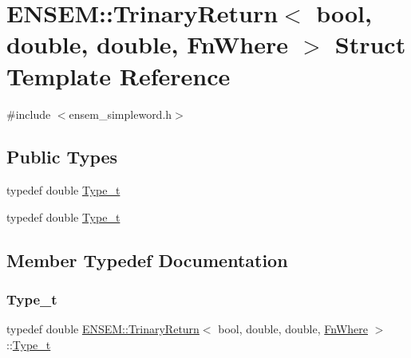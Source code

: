 \hypertarget{structENSEM_1_1TrinaryReturn_3_01bool_00_01double_00_01double_00_01FnWhere_01_4}{}\section{E\+N\+S\+EM\+:\+:Trinary\+Return$<$ bool, double, double, Fn\+Where $>$ Struct Template Reference}
\label{structENSEM_1_1TrinaryReturn_3_01bool_00_01double_00_01double_00_01FnWhere_01_4}


{\ttfamily \#include $<$ensem\+\_\+simpleword.\+h$>$}

\subsection*{Public Types}
\begin{DoxyCompactItemize}
\item 
typedef double \mbox{\hyperlink{structENSEM_1_1TrinaryReturn_3_01bool_00_01double_00_01double_00_01FnWhere_01_4_a9a6eb2e23b53eb2cd6021511101cd3a1}{Type\+\_\+t}}
\item 
typedef double \mbox{\hyperlink{structENSEM_1_1TrinaryReturn_3_01bool_00_01double_00_01double_00_01FnWhere_01_4_a9a6eb2e23b53eb2cd6021511101cd3a1}{Type\+\_\+t}}
\end{DoxyCompactItemize}


\subsection{Member Typedef Documentation}
\mbox{\label{structENSEM_1_1TrinaryReturn_3_01bool_00_01double_00_01double_00_01FnWhere_01_4_a9a6eb2e23b53eb2cd6021511101cd3a1}} 
\subsubsection{\texorpdfstring{Type\_t}{Type\_t}\hspace{0.1cm}{\footnotesize\ttfamily [1/2]}}
{\footnotesize\ttfamily typedef double \mbox{\hyperlink{structENSEM_1_1TrinaryReturn}{E\+N\+S\+E\+M\+::\+Trinary\+Return}}$<$ bool, double, double, \mbox{\hyperlink{structENSEM_1_1FnWhere}{Fn\+Where}} $>$\+::\mbox{\hyperlink{structENSEM_1_1TrinaryReturn_3_01bool_00_01double_00_01double_00_01FnWhere_01_4_a9a6eb2e23b53eb2cd6021511101cd3a1}{Type\+\_\+t}}}

